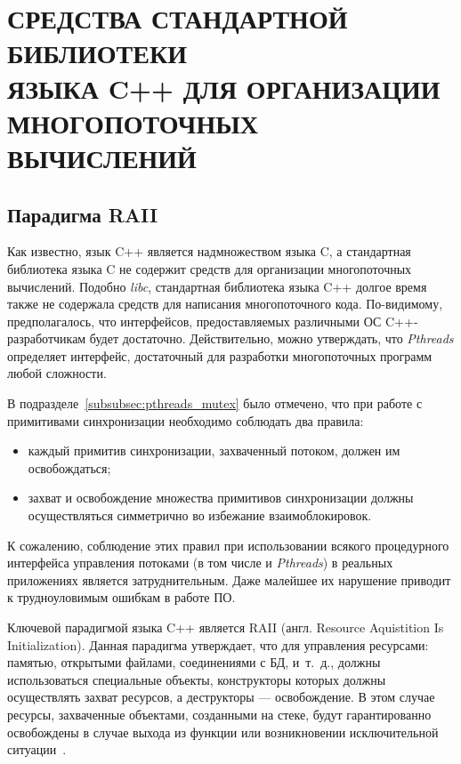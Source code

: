 \section[%
Средства стандартной библиотеки языка C++ для \\
организации многопоточных вычислений]{%
  СРЕДСТВА СТАНДАРТНОЙ БИБЛИОТЕКИ \\
  ЯЗЫКА C++ ДЛЯ ОРГАНИЗАЦИИ \\
  МНОГОПОТОЧНЫХ ВЫЧИСЛЕНИЙ
}

\subsection{Парадигма RAII}

Как известно, язык C++ является надмножеством языка C,
а стандартная библиотека языка C не содержит средств для
организации многопоточных вычислений.
Подобно \textit{libc}, стандартная библиотека языка C++
долгое время также не содержала средств для написания многопоточного кода.
По-видимому, предполагалось, что интерфейсов, предоставляемых различными ОС
C++-разработчикам будет достаточно.
Действительно, можно утверждать, что \textit{Pthreads} определяет интерфейс,
достаточный для разработки многопоточных программ любой сложности.

В подразделе~\ref{subsubsec:pthreads_mutex} было отмечено, что при работе
с примитивами синхронизации необходимо соблюдать два правила:
\begin{itemize}
\item каждый примитив синхронизации, захваченный потоком,
  должен им освобождаться;
\item захват и освобождение множества примитивов синхронизации
  должны осуществляться симметрично во избежание взаимоблокировок.
\end{itemize}
К сожалению, соблюдение этих правил при использовании всякого процедурного
интерфейса управления потоками (в том числе и \textit{Pthreads}) в реальных
приложениях является затруднительным. Даже малейшее их нарушение
приводит к трудноуловимым ошибкам в работе ПО.

Ключевой парадигмой языка C++ является RAII
(англ. Resource Aquistition Is Initialization).
Данная парадигма утверждает, что для управления ресурсами:
памятью, открытыми файлами, соединениями с БД, и~т.~д.,
должны использоваться специальные объекты,
конструкторы которых должны осуществлять захват ресурсов,
а деструкторы --- освобождение.
В этом случае ресурсы, захваченные объектами, созданными на стеке,
будут гарантированно освобождены в случае выхода из функции или
возникновении исключительной ситуации~\cite{Stroustrup:1995:DEC:193198}.

